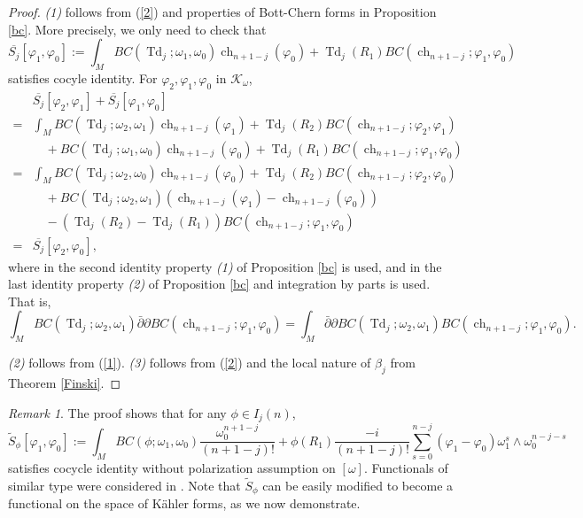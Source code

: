 \documentclass[12pt,reqno,a4paper]{amsart}
\numberwithin{equation}{section}
\def\p{\partial}
\def\bp{\bar\partial}
\def\b{\beta}
\DeclareMathOperator{\Td}{Td}
\DeclareMathOperator{\ch}{ch}
\theoremstyle{remark}
\newtheorem{remark}{Remark}
\theoremstyle{dotless}
\begin{document}
\begin{proof}
\textit{(1)} follows from (\ref{2}) and properties of Bott-Chern forms in Proposition \ref{bc}. More precisely, we only need to check that 
\begin{equation*}
\overline{S_j}[\varphi_1,\varphi_0]:=\int_M BC(\Td_j;\omega_1,\omega_0)\ch_{n+1-j}(\varphi_0)+\Td_{j}(R_1)BC(\ch_{n+1-j};\varphi_1,\varphi_0)
\end{equation*}
satisfies cocyle identity. For $\varphi_2, \varphi_1, \varphi_0$ in $\mathcal{K}_\omega$,
\begin{align*}
&\overline{S_j}[\varphi_2,\varphi_1]+\overline{S_j}[\varphi_1,\varphi_0]\\
=&\int_M BC(\Td_j;\omega_2,\omega_1)\ch_{n+1-j}(\varphi_1)+\Td_{j}(R_2)BC(\ch_{n+1-j};\varphi_2,\varphi_1) \nonumber \\
&\quad +BC(\Td_j;\omega_1,\omega_0)\ch_{n+1-j}(\varphi_0)+\Td_{j}(R_1)BC(\ch_{n+1-j};\varphi_1,\varphi_0)\\
=&\int_M BC(\Td_j;\omega_2,\omega_0)\ch_{n+1-j}(\varphi_0)+\Td_{j}(R_2)BC(\ch_{n+1-j};\varphi_2,\varphi_0) \nonumber \\
&\quad+BC(\Td_j;\omega_2,\omega_1)
\left(  \ch_{n+1-j}(\varphi_1)-\ch_{n+1-j}(\varphi_0) \right)\nonumber\\
&\quad-\left( \Td_{j}(R_2)-\Td_{j}(R_1) \right)BC(\ch_{n+1-j};\varphi_1,\varphi_0)\\
=&\overline{S_j}[\varphi_2,\varphi_0],
\end{align*}
where in the second identity property \textit{(1)} of Proposition \ref{bc} is used, and in the last identity property \textit{(2)} of Proposition \ref{bc} and integration by parts is used. That is,
\begin{equation*}
\int_M BC(\Td_j;\omega_2,\omega_1)\bp\p BC(\ch_{n+1-j};\varphi_1,\varphi_0)
=\int_M \bp\p BC(\Td_j;\omega_2,\omega_1)BC(\ch_{n+1-j};\varphi_1,\varphi_0). 
\end{equation*}

\textit{(2)} follows from (\ref{1}). \textit{(3)} follows from (\ref{2}) and the local nature of $\b_j$ from Theorem \ref{Finski}.
\end{proof}

\begin{remark}\label{remarkcocycle}
The proof shows that for any $\phi\in I_j(n)$, 
\begin{equation*}
\tilde{S}_{\phi}[\varphi_1,\varphi_0]:=\int_M BC(\phi;\omega_1,\omega_0)\frac{\omega_0^{n+1-j}}{(n+1-j)!}+\phi(R_1)\frac{-i}{(n+1-j)!}\sum^{n-j}_{s=0}(\varphi_1-\varphi_0) \omega_{1}^s\wedge \omega_0^{n-j-s}
\end{equation*}
satisfies cocycle identity without polarization assumption on $[\omega]$. Functionals of similar type were considered in \cite{donaldson1985anti,donaldson1987infinite,tian1999bott}. Note that $\tilde{S}_{\phi}$ can be easily modified to become a functional on the space of K\"ahler forms, as we now demonstrate.
\end{remark}
\end{document}
